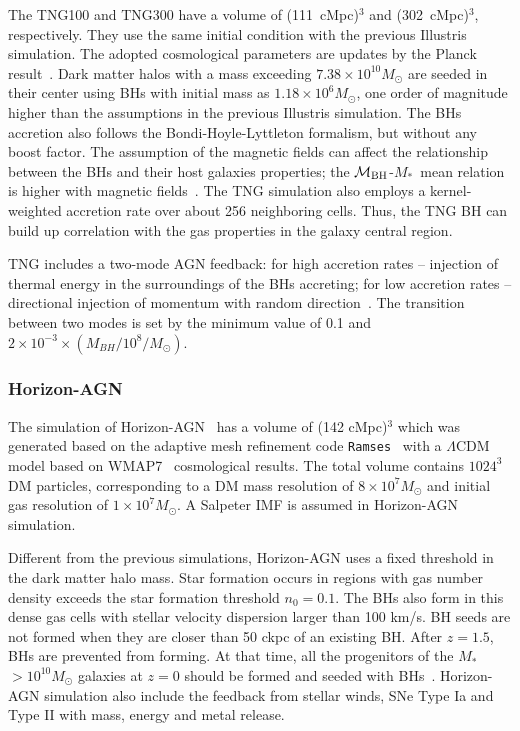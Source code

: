 \documentclass[twocolumn]{aastex631}
\def\smass{{$M_*$}}
\def\mbh{$\mathcal M_{\rm BH}$}
\begin{document}
The TNG100 and TNG300 have a volume of (111~cMpc)$^3$ and (302~cMpc)$^3$, respectively. They use the same initial condition with the previous Illustris simulation. The adopted cosmological parameters are updates by the Planck result~\citep{2016A&A...594A..13P}.
Dark matter halos with a mass exceeding $7.38 \times 10^{10} M_{\odot}$ are seeded in their center using BHs with initial mass as $1.18 \times 10^6 M_{\odot}$, one order of magnitude higher than the assumptions in the previous Illustris simulation. The BHs accretion also follows the Bondi-Hoyle-Lyttleton formalism, but without any boost factor. The assumption of the magnetic fields can affect the relationship between the BHs and their host galaxies properties; the \mbh-\smass\ mean relation is higher with magnetic fields~\citep{2018MNRAS.473.4077P}. The TNG simulation also employs a kernel-weighted accretion rate over about 256 neighboring cells. Thus, the TNG BH can build up correlation with the gas properties in the galaxy central region.

TNG includes a two-mode AGN feedback: for high accretion rates -- injection of thermal energy in the surroundings of the BHs accreting; for low accretion rates -- directional injection of momentum with random direction~\citep{2017MNRAS.465.3291W, 2018MNRAS.479.4056W}. The transition between two modes is set by the minimum value of 0.1 and $2 \times 10 ^{-3} \times (M_{BH} / 10^8/M_{\odot})$.

\subsubsection{Horizon-AGN}
The simulation of Horizon-AGN~\citep{2014MNRAS.444.1453D, 2016MNRAS.463.3948D} has a volume of (142 cMpc)$^3$ which was generated based on the adaptive mesh refinement code {\tt Ramses}~\citep{2002A&A...385..337T} with a $\Lambda$CDM model based on WMAP7~\citep{2011ApJS..192...18K} cosmological results. The total volume contains $1024^3$ DM particles, corresponding to a DM mass resolution of $8 \times 10^7  M_{\odot}$  and initial gas resolution of  $1\times10^7M_{\odot}$. A Salpeter IMF is assumed in Horizon-AGN simulation.

Different from the previous simulations, Horizon-AGN uses a fixed threshold in the dark matter halo mass. Star formation occurs in regions with gas number density exceeds the star formation threshold $n_0 = 0.1$. The BHs also form in this dense gas cells with stellar velocity dispersion larger than 100 km/s. BH seeds are not formed when they are closer than 50 ckpc of an existing BH. After $z = 1.5$, BHs are prevented from forming. At that time, all the progenitors of the \smass$>10^{10} M_{\odot}$ galaxies at $z = 0$ should be formed and seeded with BHs~\citep{2016MNRAS.460.2979V}. Horizon-AGN simulation also include the feedback from stellar winds, SNe Type Ia and Type II with mass, energy and metal release.
\end{document}
